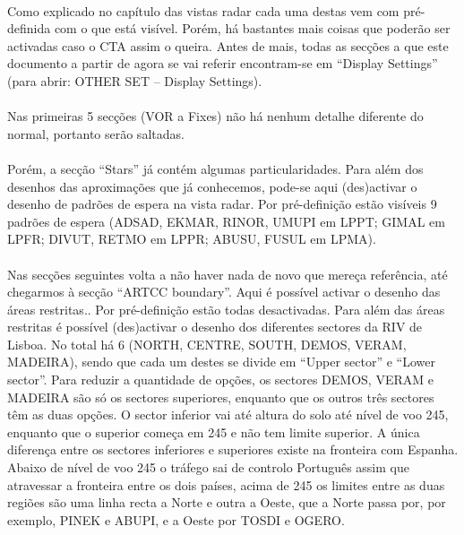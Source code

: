 \documentclass[10pt]{report}
\begin{document}
\paragraph{} Como explicado no capítulo das vistas radar cada uma destas vem com pré-definida com o
que está visível. Porém, há bastantes mais coisas que poderão ser activadas caso o CTA assim o
queira. Antes de mais, todas as secções a que este documento a partir de agora se vai referir
encontram-se em “Display Settings” (para abrir: OTHER SET – Display Settings).

\paragraph{} Nas primeiras 5 secções (VOR a Fixes) não há nenhum detalhe diferente do normal,
portanto serão saltadas.

\paragraph{} Porém, a secção “Stars” já contém algumas particularidades. Para além dos desenhos das
aproximações que já conhecemos, pode-se aqui (des)activar o desenho de padrões de espera na vista
radar. Por pré-definição estão visíveis 9 padrões de espera (ADSAD, EKMAR, RINOR, UMUPI em LPPT;
GIMAL em LPFR; DIVUT, RETMO em LPPR; ABUSU, FUSUL em LPMA).

\paragraph{} Nas secções seguintes volta a não haver nada de novo que mereça referência, até
chegarmos à secção “ARTCC boundary”. Aqui é possível activar o desenho das áreas restritas.. Por
pré-definição estão todas desactivadas. Para além das áreas restritas é possível (des)activar o
desenho dos diferentes sectores da RIV de Lisboa. No total há 6 (NORTH, CENTRE, SOUTH, DEMOS,
VERAM, MADEIRA), sendo que cada um destes se divide em “Upper sector” e “Lower sector”. Para
reduzir a quantidade de opções, os sectores DEMOS, VERAM e MADEIRA são só os sectores superiores,
enquanto que os outros três sectores têm as duas opções. O sector inferior vai até altura do solo
até nível de voo 245, enquanto que o superior começa em 245 e não tem limite superior. A única
diferença entre os sectores inferiores e superiores existe na fronteira com Espanha. Abaixo de
nível de voo 245 o tráfego sai de controlo Português assim que atravessar a fronteira entre os dois
países, acima de 245 os limites entre as duas regiões são uma linha recta a Norte e outra a Oeste,
que a Norte passa por, por exemplo, PINEK e ABUPI, e a Oeste por TOSDI e OGERO.
\end{document}
